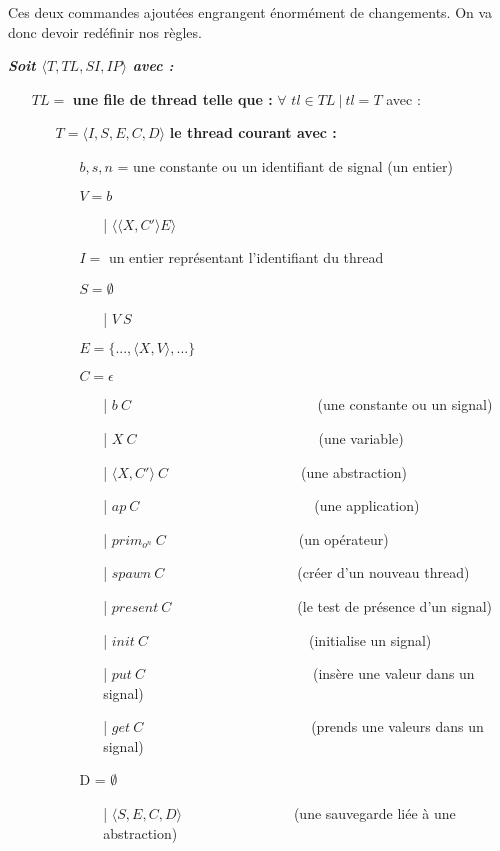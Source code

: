 \documentclass[10pt,a4paper]{report}
\begin{document}
	Ces deux commandes ajoutées engrangent énormément de changements. On va donc devoir redéfinir nos règles. 
	\bigbreak
	
	\textbf{\textit{Soit $\langle T,TL,SI,IP\rangle$ avec :}}
	
	\begin{itemize}
		\item[] $TL =$ \textbf{une file de thread telle que :} $\forall$ $tl \in TL~|~tl = T$ avec :
		\begin{itemize}
			\item[] $T = \langle I,S,E,C,D\rangle$ \textbf{le thread courant avec :}
			\begin{itemize}
				\item[] $b,s,n$ = une constante ou un identifiant de signal (un entier)
				\item[] $V = b$	
				\begin{itemize}
					\item[|] $\langle\langle X,C' \rangle E\rangle$
				\end{itemize}
				\item[] $I =$ un entier représentant l'identifiant du thread
				\item[] $S =  \emptyset$ 
				\begin{itemize}
					\item[|] $V~S$
				\end{itemize}
				\item[] $E = \{...,\langle X,V\rangle,...\}$
				\item[] $C = \epsilon$
				\begin{itemize}
					\item[|] $b~C$~~~~~~~~~~~~~~~~~~~~~~~~~~ (une constante ou un signal)
					\item[|] $X~C$~~~~~~~~~~~~~~~~~~~~~~~~~~(une variable)
					\item[|] $\langle X,C'\rangle~C$~~~~~~~~~~~~~~~~~~~(une abstraction)
					\item[|] $ap~C$~~~~~~~~~~~~~~~~~~~~~~~~~(une application)
					\item[|] $prim_{o^{n}}~C$~~~~~~~~~~~~~~~~~~~(un opérateur)
					\item[|] $spawn~C$~~~~~~~~~~~~~~~~~~~(créer d'un nouveau thread)
					\item[|] $present~C$~~~~~~~~~~~~~~~~~~(le test de présence d'un signal)
					\item[|] $init~C$~~~~~~~~~~~~~~~~~~~~~~~(initialise un signal)
					\item[|] $put~C$~~~~~~~~~~~~~~~~~~~~~~~~(insère une valeur dans un signal)
					\item[|] $get~C$~~~~~~~~~~~~~~~~~~~~~~~~(prends une valeurs dans un signal)
				\end{itemize}
				\item[] D = $\emptyset$
				\begin{itemize}
					\item[|] $\langle S,E,C,D\rangle$~~~~~~~~~~~~~~~~(une sauvegarde liée à une abstraction)
				\end{itemize}
			\end{itemize}	
		\end{itemize}
		

\end{itemize}
\end{document}
